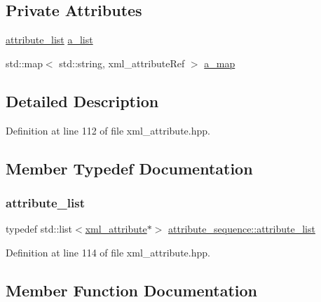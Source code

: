 \subsection*{Private Attributes}
\begin{DoxyCompactItemize}
\item 
\hyperlink{structattribute__sequence_ac9a1c1462a6334a140de3925dbeaae96}{attribute\+\_\+list} \hyperlink{structattribute__sequence_a74e1f5a9e0b448658a73d565ae51662c}{a\+\_\+list}
\item 
std\+::map$<$ std\+::string, xml\+\_\+attribute\+Ref $>$ \hyperlink{structattribute__sequence_a7d3f391a24ae70b3340b64301188ad08}{a\+\_\+map}
\end{DoxyCompactItemize}


\subsection{Detailed Description}


Definition at line 112 of file xml\+\_\+attribute.\+hpp.



\subsection{Member Typedef Documentation}
\mbox{\label{structattribute__sequence_ac9a1c1462a6334a140de3925dbeaae96}} 
\subsubsection{\texorpdfstring{attribute\+\_\+list}{attribute\_list}}
{\footnotesize\ttfamily typedef std\+::list$<$\hyperlink{classxml__attribute}{xml\+\_\+attribute}$\ast$$>$ \hyperlink{structattribute__sequence_ac9a1c1462a6334a140de3925dbeaae96}{attribute\+\_\+sequence\+::attribute\+\_\+list}}



Definition at line 114 of file xml\+\_\+attribute.\+hpp.



\subsection{Member Function Documentation}
\mbox{\label{structattribute__sequence_a0d88042550f00dd0bbbb5163f9407e9c}} 
